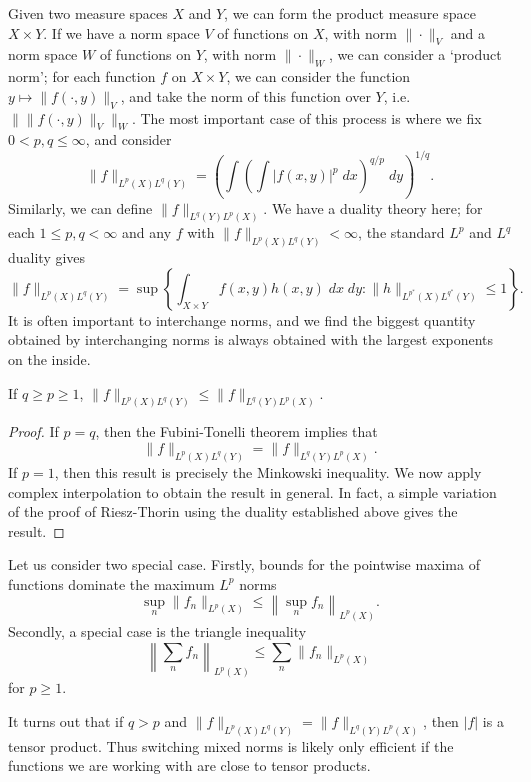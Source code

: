 Given two measure spaces $X$ and $Y$, we can form the product measure space $X \times Y$. If we have a norm space $V$ of functions on $X$, with norm $\| \cdot \|_V$ and a norm space $W$ of functions on $Y$, with norm $\| \cdot \|_W$, we can consider a `product norm'; for each function $f$ on $X \times Y$, we can consider the function $y \mapsto \| f(\cdot,y) \|_V$, and take the norm of this function over $Y$, i.e. $\| \| f(\cdot,y) \|_V \|_W$. The most important case of this process is where we fix $0 < p,q \leq \infty$, and consider
%
\[ \| f \|_{L^p(X) L^q(Y)} = \left( \int \left( \int |f(x,y)|^p \; dx \right)^{q/p}\; dy \right)^{1/q}. \]
%
Similarly, we can define $\| f \|_{L^q(Y) L^p(X)}$. We have a duality theory here; for each $1 \leq p,q < \infty$ and any $f$ with $\| f \|_{L^p(X) L^q(Y)} < \infty$, the standard $L^p$ and $L^q$ duality gives
%
\[ \| f \|_{L^p(X) L^q(Y)} = \sup \left\{ \int_{X \times Y} f(x,y) h(x,y)\; dx\;dy : \| h \|_{L^{p^*}(X) L^{q^*}(Y)} \leq 1 \right\}. \]
%
It is often important to interchange norms, and we find the biggest quantity obtained by interchanging norms is always obtained with the largest exponents on the inside.

\begin{theorem}
	If $q \geq p \geq 1$, $\| f \|_{L^p(X) L^q(Y)} \leq \| f \|_{L^q(Y) L^p(X)}$.
\end{theorem}
\begin{proof}
  If $p = q$, then the Fubini-Tonelli theorem implies that
  \[ \| f \|_{L^p(X) L^q(Y)} = \| f \|_{L^q(Y) L^p(X)}. \]
  If $p = 1$, then this result is precisely the Minkowski inequality. We now apply complex interpolation to obtain the result in general. In fact, a simple variation of the proof of Riesz-Thorin using the duality established above gives the result.
\end{proof}

Let us consider two special case. Firstly, bounds for the pointwise maxima of functions dominate the maximum $L^p$ norms
%
\[ \sup_n \| f_n \|_{L^p(X)} \leq \left\| \sup_n f_n \right\|_{L^p(X)}. \]
%
Secondly, a special case is the triangle inequality
%
\[ \left\| \sum_n f_n \right\|_{L^p(X)} \leq \sum_n \| f_n \|_{L^p(X)} \]
%
for $p \geq 1$.

It turns out that if $q > p$ and $\| f \|_{L^p(X) L^q(Y)} = \| f \|_{L^q(Y) L^p(X)}$, then $|f|$ is a tensor product. Thus switching mixed norms is likely only efficient if the functions we are working with are close to tensor products.

